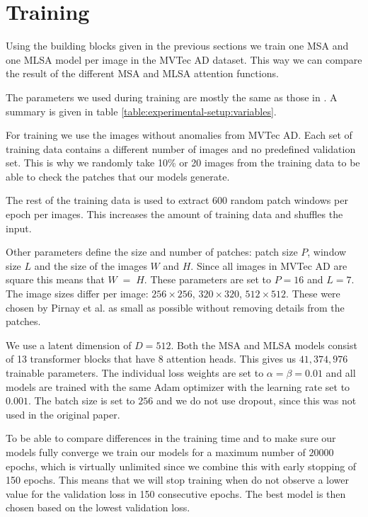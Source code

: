 \section{Training}

Using the building blocks given in the previous sections we train one MSA and one MLSA model per image in the MVTec AD dataset. This way we can compare the result of the different MSA and MLSA attention functions.

The parameters we used during training are mostly the same as those in \cite{pirnay_inpainting_2021}. A summary is given in table \ref{table:experimental-setup:variables}.

For training we use the images without anomalies from MVTec AD. Each set of training data contains a different number of images and no predefined validation set. This is why we randomly take 10\% or 20 images from the training data to be able to check the patches that our models generate.

The rest of the training data is used to extract 600 random patch windows per epoch per images. This increases the amount of training data and shuffles the input.

Other parameters define the size and number of patches: patch size $P$, window size $L$ and the size of the images $W$ and $H$. Since all images in MVTec AD are square this means that $W \;=\; H$. These parameters are set to $P = 16$ and $L = 7$. The image sizes differ per image: $256 \times 256$, $320 \times 320$, $512 \times 512$. These were chosen by Pirnay et al. as small as possible without removing details from the patches.

We use a latent dimension of $D = 512$. Both the MSA and MLSA models consist of 13 transformer blocks that have 8 attention heads. This gives us $41,374,976$ trainable parameters. The individual loss weights are set to $\alpha = \beta = 0.01$ and all models are trained with the same Adam optimizer with the learning rate set to $0.001$. The batch size is set to $256$ and we do not use dropout, since this was not used in the original paper.

To be able to compare differences in the training time and to make sure our models fully converge we train our models for a maximum number of $20000$ epochs, which is virtually unlimited since we combine this with early stopping of 150 epochs. This means that we will stop training when do not observe a lower value for the validation loss in 150 consecutive epochs. The best model is then chosen based on the lowest validation loss.


